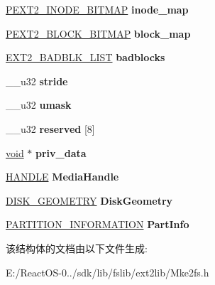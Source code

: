 \begin{DoxyCompactItemize}
\hyperlink{struct__ext2fs__bitmap}{P\+E\+X\+T2\+\_\+\+I\+N\+O\+D\+E\+\_\+\+B\+I\+T\+M\+AP} {\bfseries inode\+\_\+map}
\item 
\mbox{\label{struct__ext2__filesys_a461d59f1d8b0ae2ff761e83256805800}} 
\hyperlink{struct__ext2fs__bitmap}{P\+E\+X\+T2\+\_\+\+B\+L\+O\+C\+K\+\_\+\+B\+I\+T\+M\+AP} {\bfseries block\+\_\+map}
\item 
\mbox{\label{struct__ext2__filesys_a9e20000609502f24ada34b6a32898c1b}} 
\hyperlink{structext2__struct__badblocks__list}{E\+X\+T2\+\_\+\+B\+A\+D\+B\+L\+K\+\_\+\+L\+I\+ST} {\bfseries badblocks}
\item 
\mbox{\label{struct__ext2__filesys_aa3fbabd63878ca84b528330880d05209}} 
\+\_\+\+\_\+u32 {\bfseries stride}
\item 
\mbox{\label{struct__ext2__filesys_a2232bd019a222fb774de834668babe4e}} 
\+\_\+\+\_\+u32 {\bfseries umask}
\item 
\mbox{\label{struct__ext2__filesys_abd575c60367835ed2955140bfcd2bc87}} 
\+\_\+\+\_\+u32 {\bfseries reserved} \mbox{[}8\mbox{]}
\item 
\mbox{\label{struct__ext2__filesys_a26077c30b2028b6e370753ec26c2d0b2}} 
\hyperlink{interfacevoid}{void} $\ast$ {\bfseries priv\+\_\+data}
\item 
\mbox{\label{struct__ext2__filesys_ac52296992929690a901daf175f01e09b}} 
\hyperlink{interfacevoid}{H\+A\+N\+D\+LE} {\bfseries Media\+Handle}
\item 
\mbox{\label{struct__ext2__filesys_a1f5243a3b2eb9a908d1595700a689f1c}} 
\hyperlink{struct___d_i_s_k___g_e_o_m_e_t_r_y}{D\+I\+S\+K\+\_\+\+G\+E\+O\+M\+E\+T\+RY} {\bfseries Disk\+Geometry}
\item 
\mbox{\label{struct__ext2__filesys_a34d46b3d02b50e664c78bd5fcc163b17}} 
\hyperlink{struct___p_a_r_t_i_t_i_o_n___i_n_f_o_r_m_a_t_i_o_n}{P\+A\+R\+T\+I\+T\+I\+O\+N\+\_\+\+I\+N\+F\+O\+R\+M\+A\+T\+I\+ON} {\bfseries Part\+Info}
\end{DoxyCompactItemize}


该结构体的文档由以下文件生成\+:\begin{DoxyCompactItemize}
\item 
E\+:/\+React\+O\+S-\/0../sdk/lib/fslib/ext2lib/Mke2fs.\+h\end{DoxyCompactItemize}
